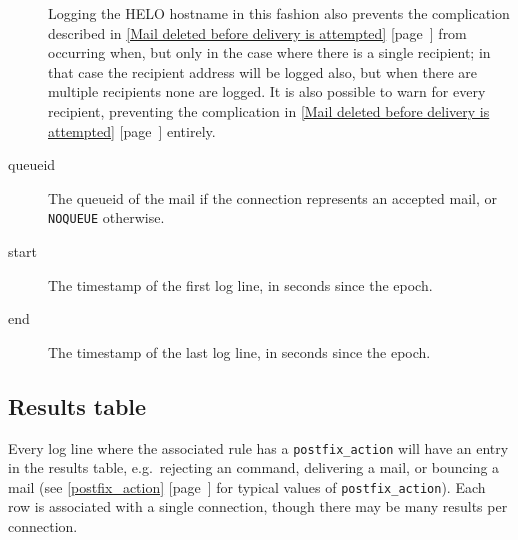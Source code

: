 \documentclass[a4paper,12pt,draft]{article}
\newcommand{\refwithpage}[1]{%
    \empty{}\ref{#1} [page~\pageref{#1}]%
}
\newcommand{\sectionref}[1]{%
    \textsection{}\refwithpage{#1}%
}
\begin{document}
\begin{description}
        Logging the HELO hostname in this fashion also prevents the
        complication described in \sectionref{Mail deleted before delivery
        is attempted} from occurring when, but only in the case where there
        is a single recipient; in that case the recipient address will be
        logged also, but when there are multiple recipients none are
        logged.  It is also possible to warn for every recipient,
        preventing the complication in \sectionref{Mail deleted before
        delivery is attempted} entirely.

    \item [queueid] The queueid of the mail if the connection represents an
        accepted mail, or \texttt{NOQUEUE} otherwise.

    \item [start] The timestamp of the first log line, in seconds since the
        epoch.

    \item [end] The timestamp of the last log line, in seconds since the
        epoch.

\end{description}

\subsection{Results table}

\label{results table}

Every log line where the associated rule has a \texttt{postfix\_action}
will have an entry in the results table, e.g.\ rejecting an \SMTP{}
command, delivering a mail, or bouncing a mail (see
\sectionref{postfix_action} for typical values of
\texttt{postfix\_action}).  Each row is associated with a single
connection, though there may be many results per connection.
\end{document}
